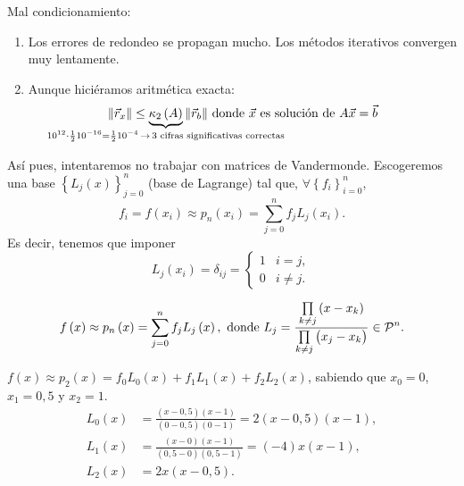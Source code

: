 \noindent Mal condicionamiento:
\begin{enumerate}[1)]
    \item Los errores de redondeo se propagan mucho. Los métodos iterativos convergen muy lentamente.
    \item Aunque hiciéramos aritmética exacta:
        \[
            \|\vec{r}_x\| \leq \underbrace{\kappa_2 \left( A \right)}_{\mathclap{10^{12}\cdot \frac{1}{2}10^{-16} = \frac{1}{2}10^{-4} \,\rightarrow\, 3\text{ cifras significativas correctas}}} \|\vec{r}_b\|\text{ donde }\vec{x}\text{ es solución de }A\vec{x} = \vec{b}
        \]
\end{enumerate}

\noindent Así pues, intentaremos no trabajar con matrices de Vandermonde. Escogeremos una base $\left\{ L_j\left( x \right) \right\}^n_{j=0}$ (base de Lagrange) tal que, $\forall \left\{ f_i \right\}^n_{i=0}$,
\[
    f_i = f\left( x_i \right) \approx p_n\left( x_i \right) = \sum^n_{j=0} f_jL_j\left( x_i \right).
\]
Es decir, tenemos que imponer
\[
    L_j\left( x_i \right) = \delta_{ij} =
    \begin{cases}
        1 & i=j, \\
        0 & i\neq j.
    \end{cases}
\]

\begin{defi}
    \[
        f\left( x \right) \approx p_n\left( x \right) = \sum_{j=0}^{n} f_jL_j\left( x \right), \text{ donde } L_j = \frac{\prod\limits_{k\neq j}\left( x-x_k \right)}{\prod\limits_{k\neq j}\left( x_j - x_k \right)} \in \mathcal{P}^n.
    \]
\end{defi}

\begin{example} %
    $f\left( x \right)\approx p_2\left( x \right) = f_0L_0\left( x \right) + f_1L_1\left( x \right) + f_2L_2\left( x \right)$, sabiendo que $x_0=0$, $x_1=0,5$ y $x_2=1$.
    \begin{align*}
        L_0\left( x \right) &= \frac{\left( x-0,5 \right)\left( x-1 \right)}{\left( 0-0,5 \right)\left( 0-1 \right)} = 2\left( x-0,5 \right)\left( x-1 \right),\\
        L_1\left( x \right) &= \frac{\left( x-0 \right)\left( x-1 \right)}{\left( 0,5-0 \right)\left( 0,5-1 \right)} = \left( -4 \right)x\left( x-1 \right),\\
        L_2\left( x \right) &= 2x\left( x-0,5 \right).
    \end{align*}
\end{example}


